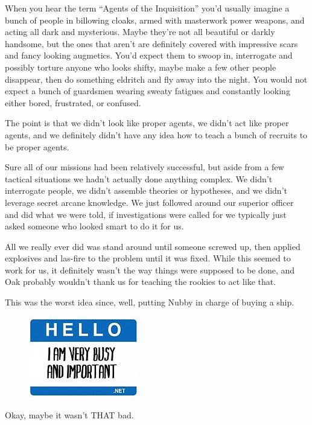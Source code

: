 When you hear the term “Agents of the Inquisition” you’d usually imagine a bunch of people in billowing cloaks, armed with masterwork power weapons, and acting all dark and mysterious. 
Maybe they’re not all beautiful or darkly handsome, but the ones that aren’t are definitely covered with impressive scars and fancy looking augmetics. 
You’d expect them to swoop in, interrogate and possibly torture anyone who looks shifty, maybe make a few other people disappear, then do something eldritch and fly away into the night. 
You would not expect a bunch of guardsmen wearing sweaty fatigues and constantly looking either bored, frustrated, or confused.

The point is that we didn’t look like proper agents, we didn’t act like proper agents, and we definitely didn’t have any idea how to teach a bunch of recruits to be proper agents. 


Sure all of our missions had been relatively successful, but aside from a few tactical situations we hadn’t actually done anything complex. 
We didn’t interrogate people, we didn’t assemble theories or hypotheses, and we didn’t leverage secret arcane knowledge. 
We just followed around our superior officer and did what we were told, if investigations were called for we typically just asked someone who looked smart to do it for us. 


All we really ever did was stand around until someone screwed up, then applied explosives and las-fire to the problem until it was fixed. 
While this seemed to work for us, it definitely wasn’t the way things were supposed to be done, and Oak probably wouldn’t thank us for teaching the rookies to act like that.

This was the worst idea since, well, putting Nubby in charge of buying a ship.

\begin{figure}
	\begin{center}
		\includegraphics[width=\figwidth]{pics/8/4.png}
	\end{center}
\end{figure}
Okay, maybe it wasn’t THAT bad.

